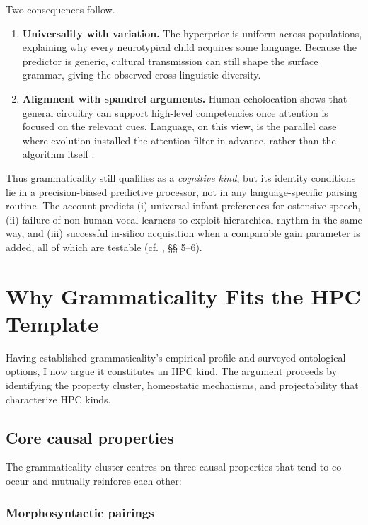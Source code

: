 \documentclass[12pt]{article}
\begin{document}
Two consequences follow.

\begin{enumerate}
  \item \textbf{Universality with variation.}  The hyperprior is uniform across populations, explaining why every neurotypical child acquires some language.  Because the predictor is generic, cultural transmission can still shape the surface grammar, giving the observed cross-linguistic diversity.
  \item \textbf{Alignment with spandrel arguments.}  Human echolocation shows that general circuitry can support high-level competencies once attention is focused on the relevant cues.  Language, on this view, is the parallel case where evolution installed the attention filter in advance, rather than the algorithm itself \parencite[see esp.\ §\emph{Echolocation: Spandrels, Adaptations, and Evolutionary Insight}]{ReynoldsEcho}.
\end{enumerate}

Thus grammaticality still qualifies as a \emph{cognitive kind}, but its identity conditions lie in a precision-biased predictive processor, not in any language-specific parsing routine.  The account predicts (i) universal infant preferences for ostensive speech, (ii) failure of non-human vocal learners to exploit hierarchical rhythm in the same way, and (iii) successful in-silico acquisition when a comparable gain parameter is added, all of which are testable (cf. \textcite{ReynoldsEcho}, §§ 5--6).%


\section{Why Grammaticality Fits the HPC Template}

Having established grammaticality's empirical profile and surveyed ontological options, I now argue it constitutes an HPC kind. The argument proceeds by identifying the property cluster, homeostatic mechanisms, and projectability that characterize HPC kinds.

\subsection{Core causal properties}

The grammaticality cluster centres on three causal properties that tend to co-occur and mutually reinforce each other:

\subsubsection{Morphosyntactic pairings}
\end{document}

